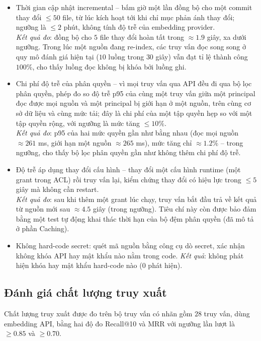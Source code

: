 \begin{itemize}
  \item Thời gian cập nhật incremental -- bấm giờ một lần đồng bộ cho một commit thay đổi $\leq 50$ file, từ lúc kích hoạt tới khi chỉ mục phản ánh thay đổi; ngưỡng là $\leq 2$ phút, không tính độ trễ của embedding provider. \\ 
  \textit{Kết quả đo}: đồng bộ cho $5$ file thay đổi hoàn tất trong $\approx 1.9$ giây, xa dưới ngưỡng. Trong lúc một nguồn đang re-index, các truy vấn đọc song song ở quy mô đánh giá hiện tại ($10$ luồng trong $30$ giây) vẫn đạt tỉ lệ thành công $100\%$, cho thấy luồng đọc không bị khóa bởi luồng ghi.
  \item Chi phí độ trễ của phân quyền -- vì mọi truy vấn qua API đều đi qua bộ lọc phân quyền, phép đo so độ trễ p95 của cùng một truy vấn giữa một principal đọc được mọi nguồn và một principal bị giới hạn ở một nguồn, trên cùng cơ sở dữ liệu và cùng mức tải; đây là chi phí của một tập quyền hẹp so với một tập quyền rộng, với ngưỡng là mức tăng $\leq 10\%$. \\
  \textit{Kết quả đo}: p95 của hai mức quyền gần như bằng nhau (đọc mọi nguồn $\approx 261$ ms, giới hạn một nguồn $\approx 265$ ms), mức tăng chỉ $\approx 1.2\%$ -- trong ngưỡng, cho thấy bộ lọc phân quyền gần như không thêm chi phí độ trễ.
  \item Độ trễ áp dụng thay đổi cấu hình -- thay đổi một cấu hình runtime (một grant trong ACL) rồi truy vấn lại, kiểm chứng thay đổi có hiệu lực trong $\leq 5$ giây mà không cần restart. \\
  \textit{Kết quả đo}: sau khi thêm một grant lúc chạy, truy vấn bắt đầu trả về kết quả từ nguồn mới sau $\approx 4.5$ giây (trong ngưỡng). Tiêu chí này còn được bảo đảm bằng một test tự động khai thác thời hạn của bộ đệm phân quyền (đã mô tả ở phần Caching).
  \item Không hard-code secret: quét mã nguồn bằng công cụ dò secret, xác nhận không khóa API hay mật khẩu nào nằm trong code.
  \textit{Kết quả}: không phát hiện khóa hay mật khẩu hard-code nào ($0$ phát hiện).
\end{itemize}

\subsection{Đánh giá chất lượng truy xuất}

Chất lượng truy xuất được đo trên bộ truy vấn có nhãn gồm $28$ truy vấn, dùng embedding API, bằng hai độ đo Recall@10 và MRR với ngưỡng lần lượt là $\geq 0.85$ và $\geq 0.70$. 

